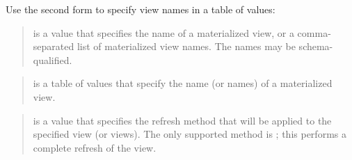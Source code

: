 \documentclass[letterpaper,10pt,english,openany,oneside]{sphinxmanual}
\begin{document}
Use the second form to specify view names in a table of
 values:
\begin{quote}

\begin{quote}










\end{quote}
\end{quote}


\begin{quote}

 is a  value that specifies the name of a materialized
view, or a comma-separated list of materialized view names. The
names may be schema-qualified.
\end{quote}

\begin{quote}

 is a table of  values that specify
the name (or names) of a materialized view.
\end{quote}

\begin{quote}

 is a  value that specifies the refresh method that
will be applied to the specified view (or views). The only supported
method is ; this performs a complete refresh of the view.
\end{quote}
\end{document}
